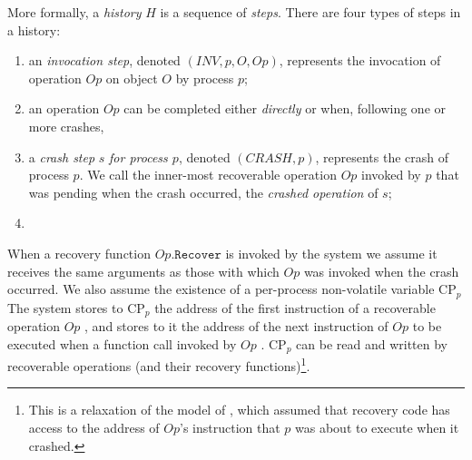 More formally, a \textit{history} $H$ is a sequence of \emph{steps}. There are four types of steps in a history:
\begin{enumerate}
\item an \emph{invocation step}, denoted $(INV, p, O, Op)$,
represents the invocation of operation $Op$ on object $O$ by process $p$;
\item an operation $Op$ can be completed either \emph{directly} or when,
following one or more crashes, 
\item a \emph{crash step} $s$ {\em for process $p$}, denoted $(CRASH, p)$,
represents the crash of process $p$. We call the inner-most recoverable operation $Op$ invoked by $p$
that was pending when the crash occurred, the \emph{crashed operation} of $s$;
\item {}
\end{enumerate}

When a recovery function $Op.\texttt{Recover}$ is invoked by the system
we assume it receives the same arguments as those with which $Op$ was invoked when the crash occurred. We also assume the existence of a per-process non-volatile variable $\text{CP}_p$
 The system stores to $\text{CP}_p$ the address
of the first instruction of a recoverable operation $Op$ ,
and stores to it the address of the next instruction of $Op$ to be executed
when a function call invoked by $Op$ .
$\text{CP}_p$ can be read
and written by recoverable operations (and their recovery functions)\footnote{This is a relaxation of the model of \cite{ABH-PODC2018}, which assumed that recovery code
has access to the address of $Op$'s instruction that $p$ was about to execute when it crashed. %
}.
%
%


